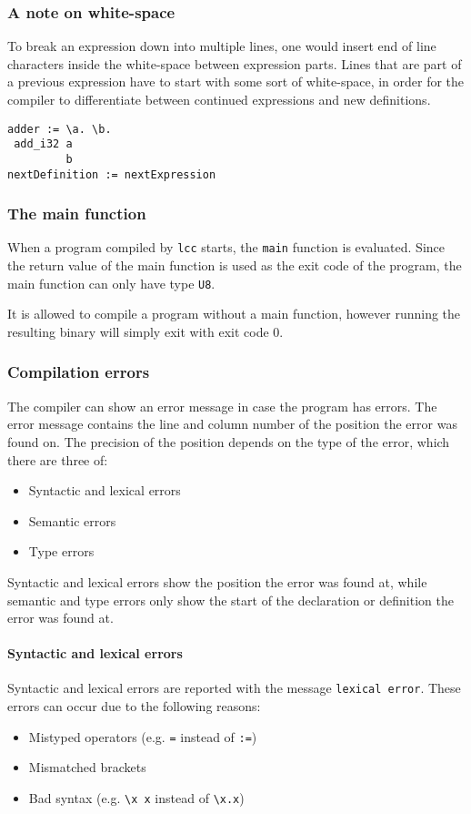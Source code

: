 \documentclass[12pt]{article}
\begin{document}
\subsubsection{A note on white-space}

To break an expression down into multiple lines, one would insert end of line
characters inside the white-space between expression parts. Lines that are part
of a previous expression have to start with some sort of white-space, in order
for the compiler to differentiate between continued expressions and new
definitions.
\lstset{showspaces=true}
\begin{lstlisting}
adder := \a. \b.
 add_i32 a
         b
nextDefinition := nextExpression
\end{lstlisting}
\lstset{showspaces=false}

\subsubsection{The main function}

When a program compiled by \verb$lcc$ starts, the \verb$main$ function is
evaluated. Since the return value of the main function is used as the exit code
of the program, the main function can only have type \verb$U8$.

It is allowed to compile a program without a main function, however running the
resulting binary will simply exit with exit code 0.

\subsubsection{Compilation errors}

The compiler can show an error message in case the program has errors. The error
message contains the line and column number of the position the error was found
on. The precision of the position depends on the type of the error, which
there are three of:
\begin{itemize}
    \item Syntactic and lexical errors
    \item Semantic errors
    \item Type errors
\end{itemize}

Syntactic and lexical errors show the position the error was found at, while
semantic and type errors only show the start of the declaration or definition
the error was found at.

\paragraph{Syntactic and lexical errors} Syntactic and lexical errors are
reported with the message \verb$lexical error$. These errors can occur due to
the following reasons:
\begin{itemize}
    \item Mistyped operators (e.g. \verb$=$ instead of \verb$:=$)
    \item Mismatched brackets 
    \item Bad syntax (e.g. \verb$\x x$ instead of \verb$\x.x$)
\end{itemize}
\end{document}
